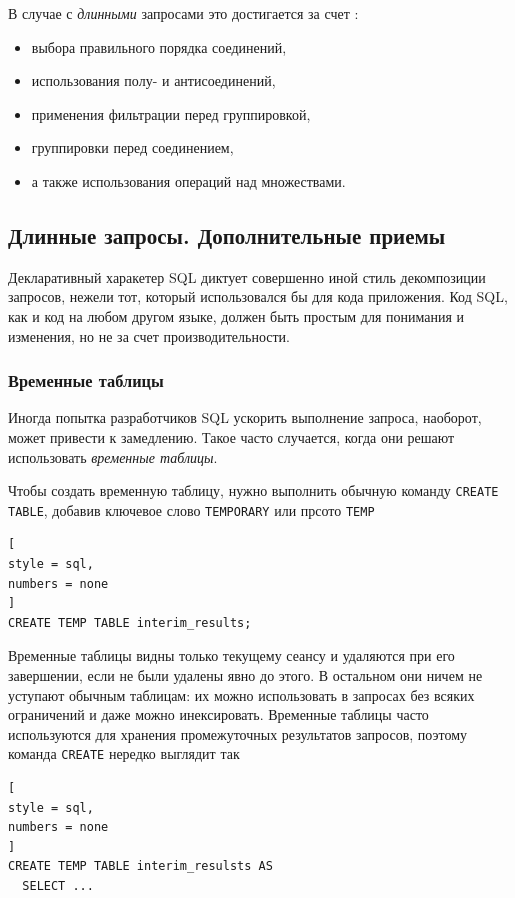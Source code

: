 \documentclass[%
	11pt,
	a4paper,
	utf8,
		]{article}
\begin{document}
В случае с \emph{длинными} запросами это достигается за счет \cite[]{dombrovskaya:postgresql-2022}:
\begin{itemize}
	\item выбора правильного порядка соединений,
	
	\item использования полу- и антисоединений,
	
	\item применения фильтрации перед группировкой,
	
	\item группировки перед соединением,
	
	\item а также использования операций над множествами.
\end{itemize}

\subsection{Длинные запросы. Дополнительные приемы}

Декларативный харакетер SQL диктует совершенно иной стиль декомпозиции запросов, нежели тот, который использовался бы для кода приложения. Код SQL, как и код на любом другом языке, должен быть простым для понимания и изменения, но не за счет производительности.

\subsubsection{Временные таблицы}

Иногда попытка разработчиков SQL ускорить выполнение запроса, наоборот, может привести к замедлению. Такое часто случается, когда они решают использовать \emph{временные таблицы}.

Чтобы создать временную таблицу, нужно выполнить обычную команду \verb|CREATE TABLE|, добавив ключевое слово \verb*|TEMPORARY| или прсото \verb|TEMP|
\begin{lstlisting}[
style = sql,
numbers = none	
]
CREATE TEMP TABLE interim_results;
\end{lstlisting}

Временные таблицы видны только текущему сеансу и удаляются при его завершении, если не были удалены явно до этого. В остальном они ничем не уступают обычным таблицам: их можно использовать в запросах без всяких ограничений и даже можно инексировать. Временные таблицы часто используются для хранения промежуточных результатов запросов, поэтому команда \verb|CREATE| нередко выглядит так \cite[]{dombrovskaya:postgresql-2022}
\begin{lstlisting}[
style = sql,
numbers = none
]
CREATE TEMP TABLE interim_resulsts AS 
  SELECT ...
\end{lstlisting}
\end{document}

